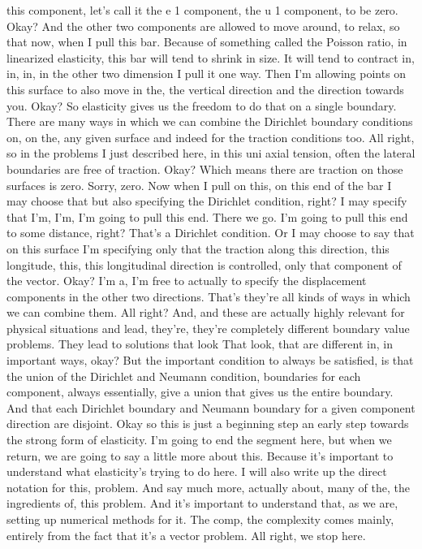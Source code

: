 \documentclass[10pt]{article}
\begin{document}
this component, let's call it the e 1 component, the u 1 component, to be zero. Okay? And the other two components are allowed to move around, to relax, so that now, when I pull this bar. Because of something called the Poisson ratio, in linearized elasticity, this bar will tend to shrink in size. It will tend to contract in, in, in, in the other two dimension I pull it one way. Then I'm allowing points on this surface to also move in the, the vertical direction and the direction towards you. Okay? So elasticity gives us the freedom to do that on a single boundary. There are many ways in which we can combine the Dirichlet boundary conditions on, on the, any given surface and indeed for the traction conditions too. All right, so in the problems I just described here, in this uni axial tension, often the lateral boundaries are free of traction. Okay? Which means there are traction on those surfaces is zero.  Sorry, zero. Now when I pull on this, on this end of the bar I may choose that but also specifying the Dirichlet condition, right? I may specify that I'm, I'm, I'm going to pull this end. There we go. I'm going to pull this end to some distance, right? That's a Dirichlet condition. Or I may choose to say that on this surface I'm specifying only that the traction along this direction, this longitude, this, this longitudinal direction is controlled, only that component of the vector. Okay? I'm a, I'm free to actually to specify the displacement components in the other two directions. That's they're all kinds of ways in which we can combine them. All right? And, and these are actually highly relevant for physical situations and lead, they're, they're completely different boundary value problems. They lead to solutions that look That look, that are different in, in important ways, okay? But the important condition to always be satisfied, is that the union of the Dirichlet and Neumann condition, boundaries for each component, always essentially, give a union that gives us the entire boundary. And that each Dirichlet boundary and Neumann boundary for a given component direction are disjoint. Okay so this is just a beginning step an early step towards the strong form of elasticity. I'm going to end the segment here, but when we return, we are going to say a little more about this. Because it's important to understand what elasticity's trying to do here. I will also write up the direct notation for this, problem. And say much more, actually about, many of the, the ingredients of, this problem. And it's important to understand that, as we are, setting up numerical methods for it. The comp, the complexity comes mainly, entirely from the fact that it's a vector problem. All right, we stop here.
\end{document}
